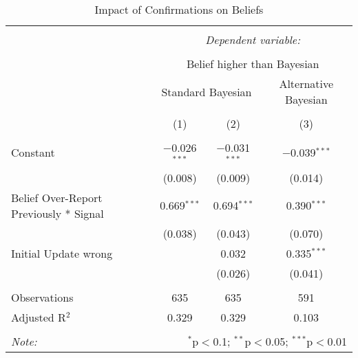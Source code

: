 
\begin{table}[!htbp] \centering 
  \caption{Impact of Confirmations on Beliefs} 
  \label{tab:confirmation_main} 
\begin{tabular}{@{\extracolsep{5pt}}lccc} 
\\[-1.8ex]\hline 
\hline \\[-1.8ex] 
 & \multicolumn{3}{c}{\textit{Dependent variable:}} \\ 
\cline{2-4} 
\\[-1.8ex] & \multicolumn{3}{c}{Belief higher than Bayesian} \\ 
 & \multicolumn{2}{c}{Standard Bayesian} & Alternative Bayesian \\ 
 \\[-1.8ex] & (1) & (2) & (3)\\ 
\hline \\[-1.8ex] 
 Constant & $-$0.026$^{***}$ & $-$0.031$^{***}$ & $-$0.039$^{***}$ \\ 
  & (0.008) & (0.009) & (0.014) \\ 
  Belief Over-Report Previously * Signal & 0.669$^{***}$ & 0.694$^{***}$ & 0.390$^{***}$ \\ 
  & (0.038) & (0.043) & (0.070) \\ 
  Initial Update wrong &  & 0.032 & 0.335$^{***}$ \\ 
  &  & (0.026) & (0.041) \\ 
 \hline \\[-1.8ex] 
Observations & 635 & 635 & 591 \\ 
Adjusted R$^{2}$ & 0.329 & 0.329 & 0.103 \\ 
\hline 
\hline \\[-1.8ex] 
\textit{Note:}  & \multicolumn{3}{r}{$^{*}$p$<$0.1; $^{**}$p$<$0.05; $^{***}$p$<$0.01} \\ 
\end{tabular} 
\end{table} 
